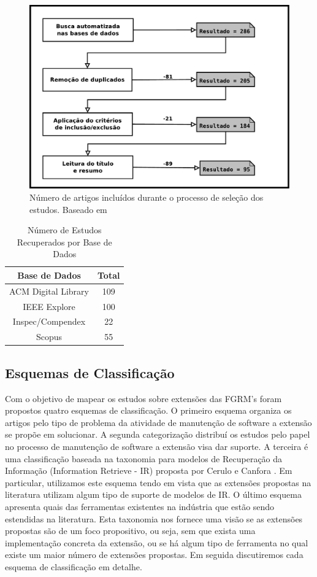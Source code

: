 \documentclass[msc]{ppgccufmg} %
\begin{document}
\begin{figure}
	\centering
	\includegraphics[width=0.75\linewidth]{../img/diagrama-processo-selecao.pdf}
	\caption{Número de artigos incluídos durante o processo de seleção dos estudos. Baseado em \cite{Petersen2015}}
	\label{fig:diagrama-processo-selecao}
\end{figure}

\begin{table}[htb]
	\centering
	\caption{Número de Estudos Recuperados por Base de Dados}
	\label{tab:estudos-por-base-dados}
	\begin{tabular}{cc}
		\hline
		\textbf{Base de Dados} & \textbf{Total} \\ \hline
		ACM Digital Library    & 109            \\
		IEEE Explore           & 100            \\
		Inspec/Compendex       & 22             \\
		Scopus                 & 55             \\ \hline
	\end{tabular}

\end{table}

\subsection{Esquemas de Classificação}
\label{subsec:map-esquemas-classificacao}

Com o objetivo de mapear os estudos sobre extensões das FGRM's foram propostos quatro esquemas de classificação. O primeiro esquema organiza os artigos pelo tipo de problema da atividade de manutenção de software a extensão se propõe em solucionar. A segunda categorização distribuí os estudos pelo papel no processo de manutenção de software a extensão visa dar suporte. A terceira é uma classificação baseada na taxonomia para modelos de Recuperação da Informação (Information Retrieve - IR) proposta por Cerulo e Canfora \cite{cerulo2004taxonomy}. Em particular, utilizamos este esquema tendo em vista que as extensões propostas na literatura utilizam algum tipo de suporte de modelos de IR. O último esquema apresenta quais das ferramentas existentes na indústria que estão sendo estendidas na literatura. Esta taxonomia nos fornece uma visão se as extensões propostas são de um foco propositivo, ou seja, sem que exista uma implementação concreta da extensão, ou se há algum tipo de ferramenta no qual existe um maior número de extensões propostas. Em seguida discutiremos cada esquema de classificação em detalhe.
\end{document}
